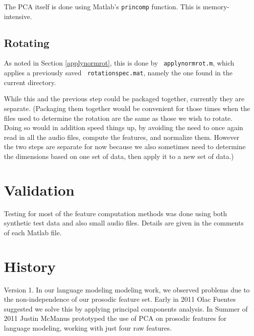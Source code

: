 \documentclass[11pt]{article}
\begin{document}
The PCA itself is done using Matlab's {\tt princomp} function.  This
is memory-intensive.

\subsection{Rotating}

As noted in Section \ref{applynormrot}, this is done by {\tt
  applynormrot.m}, which applies a previously saved {\tt
  rotationspec.mat}, namely the one found in the current directory.

While this and the previous step could be packaged together, currently
they are separate.  (Packaging them together would be convenient for
those times when the files used to determine the rotation are the same
as those we wish to rotate.  Doing so would in addition speed things
up, by avoiding the need to once again read in all the audio files,
compute the features, and normalize them.  However the two steps are
separate for now because we also sometimes need to determine the
dimensions based on one set of data, then apply it to a new set of
data.)

\section{Validation}

Testing for most of the feature computation methods was done using
both synthetic test data and also small audio files.  Details are
given in the comments of each Matlab file. 


\section{History}

Version 1.  In our language modeling modeling work, we observed
problems due to the non-independence of our prosodic feature set.
Early in 2011 Olac Fuentes suggested we solve this by applying
principal components analysis.  In Summer of 2011 Justin McManus
prototyped the use of PCA on prosodic features for language modeling,
working with just four raw features.
\end{document}
